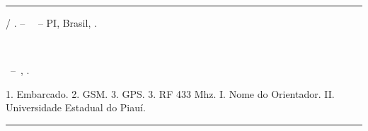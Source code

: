 \documentclass[
	12pt,				%
	openright,			%
	oneside,			%
	a4paper,			%
	chapter=TITLE,		%
	english,			%
	brazil,				%
	]{abntex2}
\begin{document}
\begin{fichacatalografica}
	\vspace*{\fill}					%
	\hrule							%
	\begin{center}					%
	\begin{minipage}[c]{12.5cm}		%
	
	\imprimirautor
	
	\hspace{0.5cm} 
	{\imprimirtitulo / \imprimirautor. --	\imprimirlocal~~-- PI, Brasil, \imprimirdata.}
	
	{\hspace{0.5cm}\imprimirorientadorRotulo~\imprimirorientador}
	
	\hspace{0.5cm}\parbox[t]{\textwidth}{\imprimirtipotrabalho~--~\imprimirinstituicao, \imprimirdata.}

    \hspace{0.5cm}
		1. Embarcado.
		2. GSM.
        3. GPS.
        3. RF 433 Mhz.
		I. Nome do Orientador.
		II. Universidade Estadual do Piauí.
		 			
	
	\end{minipage}
	\end{center}
	\hrule
\end{fichacatalografica}

\end{document}
